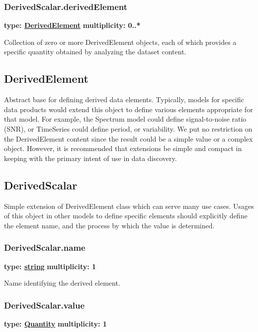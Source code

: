   \subsubsection{DerivedScalar.derivedElement}
  \textbf{type: \hyperref[sect:derived_element]{DerivedElement}} \newline
  \textbf{multiplicity: 0..*} \newline

  Collection of zero or more DerivedElement objects, each of which provides a
  specific quantity obtained by analyzing the dataset content.
  
\subsection{DerivedElement}
\label{sect:derived_element}

Abstract base for defining derived data elements. Typically, models for
specific data products would extend this object to define various elements
appropriate for that model. For example, the Spectrum model could define
signal-to-noise ratio (SNR), or TimeSeries could define period, or
variability. We put no restriction on the DerivedElement content since the
result could be a simple value or a complex object. However, it is recommended
that extensions be simple and compact in keeping with the primary intent of
use in data discovery.

\subsection{DerivedScalar}
\label{sect:derived_scalar}
Simple extension of DerivedElement class which can serve many use cases.
Usages of this object in other models to define specific elements should
explicitly define the element name, and the process by which the value is
determined.

  \subsubsection{DerivedScalar.name}
  \textbf{type: \hyperref[sect:ivoa]{string}} \newline
  \textbf{multiplicity: 1} \newline

  Name identifying the derived element.
  
  \subsubsection{DerivedScalar.value}
  \textbf{type: \hyperref[sect:ivoa]{Quantity}} \newline
  \textbf{multiplicity: 1} \newline

